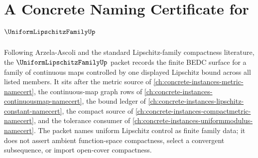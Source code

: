 \chapter{A Concrete Naming Certificate for $\UniformLipschitzFamilyUp$}
\label{ch:concrete-instances-uniform-lipschitz-family-namecert}

Following Arzela-Ascoli and the standard Lipschitz-family compactness literature, the $\UniformLipschitzFamilyUp$ packet records the finite BEDC surface for a family of continuous maps controlled by one displayed Lipschitz bound across all listed members. It sits after the metric source of \autoref{ch:concrete-instances-metric-namecert}, the continuous-map graph rows of \autoref{ch:concrete-instances-continuousmap-namecert}, the bound ledger of \autoref{ch:concrete-instances-lipschitz-constant-namecert}, the compact source of \autoref{ch:concrete-instances-compactmetric-namecert}, and the tolerance consumer of \autoref{ch:concrete-instances-uniformmodulus-namecert}. The packet names uniform Lipschitz control as finite family data; it does not assert ambient function-space compactness, select a convergent subsequence, or import open-cover compactness.


